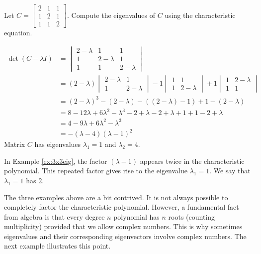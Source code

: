 \documentclass{ximera}
\begin{document}
\begin{example}\label{ex:3x3eig}
Let $C=\begin{bmatrix} 2 & 1 & 1\\ 1 & 2 & 1\\ 1 & 1 & 2\end{bmatrix}$.  Compute the eigenvalues of $C$ using the characteristic equation.
\begin{explanation}
\begin{align*}\det(C-\lambda I)&=\begin{vmatrix}2-\lambda & 1 & 1\\ 1 & 2-\lambda & 1\\ 1 & 1 & 2-\lambda\end{vmatrix}\\
&=(2-\lambda)\begin{vmatrix}2-\lambda&1\\1&2-\lambda\end{vmatrix}-1\begin{vmatrix}1&1\\1&2-\lambda\end{vmatrix}+1\begin{vmatrix}1&2-\lambda\\1&1\end{vmatrix}\\
&=(2-\lambda)^3-(2-\lambda)-((2-\lambda)-1)+1-(2-\lambda)\\
&=8-12\lambda+6\lambda^2-\lambda^3-2+\lambda-2+\lambda+1+1-2+\lambda\\
&=4-9\lambda+6\lambda^2-\lambda^3\\
&=-(\lambda-4)(\lambda-1)^2
\end{align*}
Matrix $C$ has eigenvalues $\lambda_1=1$ and $\lambda_2=4$.
\end{explanation}
\end{example}

In Example \ref{ex:3x3eig}, the factor  $(\lambda-1)$ appears twice in the characteristic polynomial.  This repeated factor gives rise to the eigenvalue $\lambda_1=1$.  We say that $\lambda_1=1$ has  $2$. 

The three examples above are a bit contrived.  It is not always possible to completely factor the characteristic polynomial.  However, a fundamental fact from algebra is that every degree $n$ polynomial has $n$ roots (counting multiplicity) provided that we allow complex numbers.  This is why sometimes eigenvalues and their corresponding eigenvectors involve complex numbers.  The next example illustrates this point.
\end{document}
